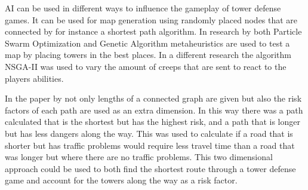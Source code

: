 AI can be used in different ways to influence the gameplay of tower defense games. It can be used for map generation using randomly placed nodes that are connected by for instance a shortest path algorithm. \cite{avery2011computational} In research by \cite{huo2009application}  both Particle Swarm Optimization and Genetic Algorithm metaheuristics are used to test a map by placing towers in the best places\cite{huo2009application}.  In a different research the algorithm NSGA-II was used to vary the amount of creeps that are sent to react to the players abilities\cite{ariyadicreep}. 

In the paper by \cite{guimarans2016multi}  not only lengths of a connected graph are given but also the risk factors of each path are used as an extra dimension. In this way there was a path calculated that is the shortest but has the highest risk, and a path that is longer but has less dangers along the way. This was used to calculate if a road that is shorter but has traffic problems would require less travel time than a road that was longer but where there are no traffic problems\cite{guimarans2016multi}.  This two dimensional approach could be used to both find the shortest route through a tower defense game and account for the towers along the way as a risk factor. 





